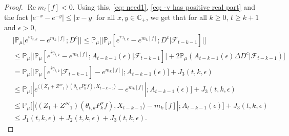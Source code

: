 \documentclass[12pt,a4paper]{amsart}
\theoremstyle{plain}
\theoremstyle{definition}
\numberwithin{equation}{section}
\begin{document}
\begin{proof}
$\operatorname {Re} m_t[f] < 0$. 
Using this, \eqref{eq: need1}, \eqref{eq: -v has positive real part} and the fact
$|e^{-x} - e^{-y}| \leq |x-y|$ for all $x,y \in \mathbb C_+$, we get that for all $k\geq 0$, $t\geq k+1$ and $\epsilon> 0$,
\begin{align}
  \label{eq: inequality that will used later}
  & \big|\mathbb{P}_{\mu}\big[e^{i\gamma_{t,k}}-e^{m_k[f]}; D^c\big]\big|
         \leq \mathbb{P}_{\mu}\Big[\big| \mathbb{P}_{\mu}[e^{i\gamma_{t,k}}-e^{m_k[f]}; D^c | \mathscr F_{t-k-1}]\big|\Big] \\
  & \leq \mathbb{P}_{\mu}\Big[\big| \mathbb{P}_{\mu}[e^{i\gamma_{t,k}}-e^{m_k[f]}; A_{t-k-1}(\epsilon)| \mathscr F_{t-k-1}]\big| + 2\mathbb P_\mu(A_{t-k-1}(\epsilon) \Delta D^c| \mathscr F_{t-k-1})\Big] \\
  & = \mathbb{P}_{\mu}\Big[ \big|\mathbb{P}_{\mu}[e^{i\gamma_{t,k}}| \mathscr F_{t-k-1}]-e^{m_k[f]}\big|;A_{t-k-1}(\epsilon)\Big] + J_3(t,k,\epsilon) \\
  & \leq \mathbb{P}_{\mu}\big[|e^{\langle (Z_1+Z'''_1) (\theta_{t,k}P^\alpha_k f),X_{t-k-1}\rangle}-e^{m_k[f]}|;A_{t-k-1}(\epsilon)\big]+  J_3(t,k,\epsilon) \\
  & \leq \mathbb{P}_{\mu}\big[|\langle (Z_1+Z'''_1)(\theta_{t,k}P^\alpha_k f),X_{t-k-1}\rangle-m_k[f]|;A_{t-k-1}(\epsilon)\big]+  J_3(t,k,\epsilon) \\
  & \leq J_1(t,k,\epsilon) + J_2(t,k,\epsilon)+J_3(t,k,\epsilon).
\end{align}


\end{proof}
\end{document}
